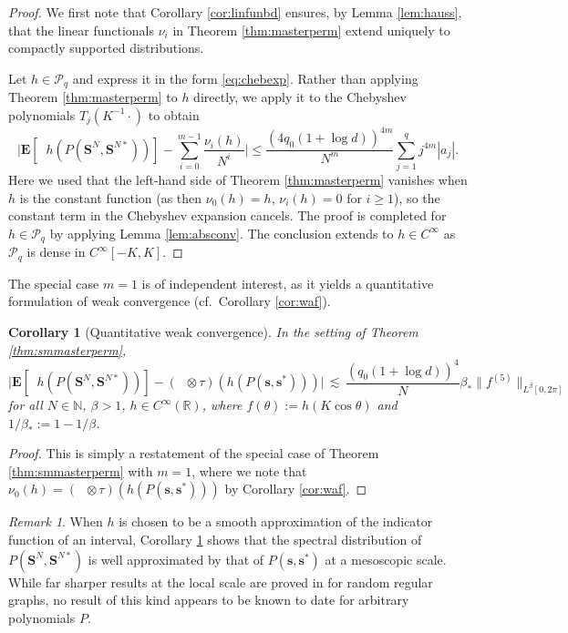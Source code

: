 \documentclass[10pt,reqno]{amsart}
\newtheorem{cor}[thm]{Corollary}
\theoremstyle{definition}
\theoremstyle{remark}
\newtheorem{rem}[thm]{Remark}
\numberwithin{equation}{section}
\numberwithin{figure}{section}
\numberwithin{table}{section}
\newcommand{\ntrD}{\mathop{\mathrm{tr}_D}}
\newcommand{\ntrND}{\mathop{\mathrm{tr}_{DN}}}
\newcommand{\EE}{\mathbf{E}}
\begin{document}
\begin{proof}
We first note that Corollary \ref{cor:linfunbd} ensures, by 
Lemma \ref{lem:hauss}, that the linear functionals $\nu_i$ 
in Theorem \ref{thm:masterperm} extend uniquely to compactly supported
distributions.

Let $h\in\mathcal{P}_q$ and express it in the form \eqref{eq:chebexp}.
Rather than applying Theorem \ref{thm:masterperm} to $h$ directly, we apply
it to the Chebyshev polynomials $T_j(K^{-1}\cdot)$ to obtain
$$
	\bigg|\EE[
	\ntrND h(P(\boldsymbol{S}^N,\boldsymbol{S}^{N*}))]
	- \sum_{i=0}^{m-1} \frac{\nu_i(h)}{N^i}
	\bigg|
	\le
	\frac{(4q_0(1+\log d))^{4m}}{N^m}
	\sum_{j=1}^q
	j^{4m}
	|a_j|.
$$
Here we used that the left-hand side of Theorem \ref{thm:masterperm} 
vanishes when $h$ is the constant function (as then $\nu_0(h)=h$, 
$\nu_i(h)=0$ for $i\ge 1$), so the constant term in the Chebyshev 
expansion cancels. The proof is completed for
$h\in\mathcal{P}_q$ by applying Lemma \ref{lem:absconv}.
The conclusion extends to $h\in C^\infty$
as $\mathcal{P}_q$ is dense in $C^\infty[-K,K]$.
\end{proof}

The special case $m=1$ is of independent interest, as it yields a 
quantitative formulation of weak convergence (cf.\ Corollary 
\ref{cor:waf}).

\begin{cor}[Quantitative weak convergence]
\label{cor:quantwaf}
In the setting of Theorem \ref{thm:smmasterperm},
$$
        \big|\EE[\ntrND h(P(\boldsymbol{S}^N,\boldsymbol{S}^{N*}))] -
        ({\ntrD}\otimes{\tau})(h(P(\boldsymbol{s},\boldsymbol{s}^*)))
	\big|
        {\,\lesssim\,}
        \frac{(q_0(1+\log d))^{4}}{N}
        \beta_*\|f^{(5)}\|_{L^\beta[0,2\pi]}
$$
for all $N\in\mathbb{N}$, $\beta>1$, $h\in C^\infty(\mathbb{R})$,
where $f(\theta):=h(K\cos\theta)$ and $1/\beta_*:=1-1/\beta$.
\end{cor}

\begin{proof}
This is simply a restatement of the special case of
Theorem \ref{thm:smmasterperm} with $m=1$, where we note that
$\nu_0(h)=({\ntrD}\otimes{\tau})(h(P(\boldsymbol{s},\boldsymbol{s}^*)))$ 
by Corollary \ref{cor:waf}.
\end{proof}

\begin{rem}
When $h$ is chosen to be a smooth approximation of the indicator function 
of an interval, Corollary \ref{cor:quantwaf} shows that the spectral 
distribution of $P(\boldsymbol{S}^N,\boldsymbol{S}^{N*})$ is well 
approximated by that of $P(\boldsymbol{s},\boldsymbol{s}^*)$ at a 
mesoscopic scale. While far sharper results at the local scale are proved 
in \cite{HY24,HMY24,HMY25} for random regular graphs,
no result of this kind appears to be known to date for arbitrary 
polynomials $P$.
\end{rem}
\end{document}
